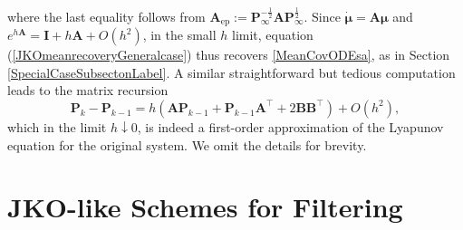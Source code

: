 \documentclass[letterpaper,10pt,twocolumn,conference]{ieeeconf}
\newcommand{\bbc}{\bm{c}}
\newcommand{\bbv}{\bm{v}}
\newcommand{\bbw}{\bm{w}}
\newcommand{\bbx}{{\bm{x}}}
\newcommand{\bbz}{\bm{z}}
\newcommand{\ep}{_{\mathrm{ep}}}
\newcommand{\bbmu}{\bm{\mu}}
\newcommand{\bbP}{\bm{P}}
\newcommand{\bbR}{\bm{R}}
\newcommand{\bbA}{\bm{A}}
\newcommand{\bbB}{\bm{B}}
\newcommand{\bbI}{\bm{I}}
\begin{document}
where the last equality follows from $\bbA\ep:=\bbP_{\infty}^{-\frac{1}{2}}\bbA\bbP_{\infty}^{\frac{1}{2}}$. Since $\dot{\bbmu} = \bbA\bbmu$ and $e^{h\bbA} = \bbI + h\bbA + O(h^{2})$, in the small $h$ limit, equation (\ref{JKOmeanrecoveryGeneralcase}) thus recovers \eqref{MeanCovODEsa}, as in Section \ref{SpecialCaseSubsectonLabel}. A similar straightforward but tedious computation leads to the matrix recursion 
\begin{equation}\label{eq:unproven}
\bbP_{k} - \bbP_{k-1} = h(\bbA\bbP_{k-1} + \bbP_{k-1}\bbA^{\top} + 2\bbB\bbB^{\top}) + O(h^{2}),
\end{equation} which in the limit $h\downarrow 0$, is indeed a first-order approximation of the Lyapunov equation for the original system. We omit the details for brevity.







\section{JKO-like Schemes for Filtering}
\label{FilteringSectionLabel}
\end{document}
